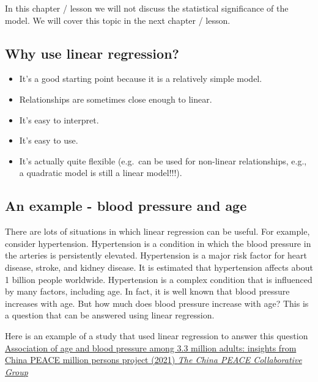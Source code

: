 \documentclass[
  letterpaper,
  8pt,
  a4paper]{book}
\providecommand{\tightlist}{%
  \setlength{\itemsep}{0pt}\setlength{\parskip}{0pt}}
\begin{document}
In this chapter / lesson we will not discuss the statistical
significance of the model. We will cover this topic in the next chapter
/ lesson.

\subsection*{Why use linear
regression?}\label{why-use-linear-regression}

\begin{itemize}
\tightlist
\item
  It's a good starting point because it is a relatively simple model.
\item
  Relationships are sometimes close enough to linear.
\item
  It's easy to interpret.
\item
  It's easy to use.
\item
  It's actually quite flexible (e.g.~can be used for non-linear
  relationships, e.g., a quadratic model is still a linear model!!!).
\end{itemize}

\subsection*{An example - blood pressure and
age}\label{an-example---blood-pressure-and-age}

There are lots of situations in which linear regression can be useful.
For example, consider hypertension. Hypertension is a condition in which
the blood pressure in the arteries is persistently elevated.
Hypertension is a major risk factor for heart disease, stroke, and
kidney disease. It is estimated that hypertension affects about 1
billion people worldwide. Hypertension is a complex condition that is
influenced by many factors, including age. In fact, it is well known
that blood pressure increases with age. But how much does blood pressure
increase with age? This is a question that can be answered using linear
regression.

Here is an example of a study that used linear regression to answer this
question
\href{https://journals.lww.com/jhypertension/fulltext/2021/06000/association_of_age_and_blood_pressure_among_3_3.15.aspx}{Association
of age and blood pressure among 3.3 million adults: insights from China
PEACE million persons project (2021) \emph{The China PEACE Collaborative
Group}}
\end{document}
